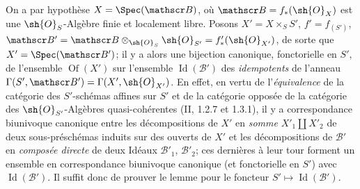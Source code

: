 
On a par hypothèse $X=\Spec(\mathscr B)$, où $\mathscr B=f_*(\sh{O}_X)$ est une $\sh{O}_S$-Algèbre finie et localement libre. Posons $X'=X\times_S S'$, $f'=f_{(S')}$, $\mathscr B'=\mathscr B\otimes_{\sh{O}_S}\sh{O}_{S'}=f'_*(\sh{O}_{X'})$, de sorte que $X'=\Spec(\mathscr B')$; il y a alors une bijection canonique, fonctorielle en $S'$, de l'ensemble $\operatorname{Of}(X')$ sur l'ensemble $\operatorname{Id}(\mathscr B')$ des \emph{idempotents} de l'anneau $\Gamma(S',\mathscr B')=\Gamma(X',\sh{O}_{X'})$. En effet, en vertu de l'\emph{équivalence} de la catégorie des $S'$-schémas affines sur $S'$ et de la catégorie opposée de la catégorie des $\sh{O}_{S'}$-Algèbres quasi-cohérentes (II, 1.2.7 et 1.3.1), il y a correspondance biunivoque canonique entre les décompositions de $X'$ en \emph{somme} $X'_1\amalg X'_2$ de deux sous-préschémas induits sur des ouverts de $X'$ et les décompositions de $\mathscr B'$ en \emph{composée directe} de deux Idéaux $\mathscr B'_1$, $\mathscr B'_2$; ces dernières à leur tour forment un ensemble en correspondance biunivoque canonique (et fonctorielle en $S'$) avec $\operatorname{Id}(\mathscr B')$. Il suffit donc de prouver le lemme pour le foncteur $S'\longmapsto\operatorname{Id}(\mathscr B')$.

